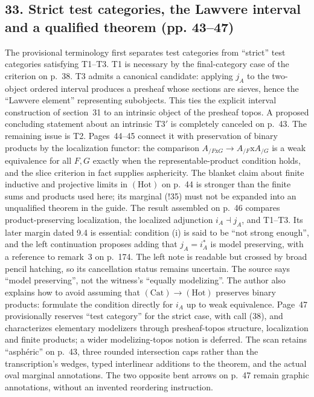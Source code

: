 \documentclass[10pt,oneside]{book}
\begin{document}
\subsection*{33. Strict test categories, the Lawvere interval and a qualified theorem (pp. 43--47)}
The provisional terminology first separates test categories from ``strict'' test categories satisfying T1--T3. T1 is necessary by the final-category case of the criterion on p.~38. T3 admits a canonical candidate: applying $j_A$ to the two-object ordered interval produces a presheaf whose sections are sieves, hence the ``Lawvere element'' representing subobjects. This ties the explicit interval construction of section~31 to an intrinsic object of the presheaf topos. A proposed concluding statement about an intrinsic T3$'$ is completely canceled on p.~43. The remaining issue is T2. Pages~44--45 connect it with preservation of binary products by the localization functor: the comparison $A_{/F\mathrm{x}G}\to A_{/F}\mathrm{x}A_{/G}$ is a weak equivalence for all $F,G$ exactly when the representable-product condition holds, and the slice criterion in fact supplies asphericity. The blanket claim about finite inductive and projective limits in $(\mathrm{Hot})$ on p.~44 is stronger than the finite sums and products used here; its marginal (!35) must not be expanded into an unqualified theorem in the guide. The result assembled on p.~46 compares product-preserving localization, the localized adjunction $i_A\dashv j_A$, and T1--T3. Its later margin dated 9.4 is essential: condition (i) is said to be ``not strong enough'', and the left continuation proposes adding that $j_A=i_A^*$ is model preserving, with a reference to remark~3 on p.~174. The left note is readable but crossed by broad pencil hatching, so its cancellation status remains uncertain. The source says ``model preserving'', not the witness's ``equally modelizing''. The author also explains how to avoid assuming that $(\mathrm{Cat})\to(\mathrm{Hot})$ preserves binary products: formulate the condition directly for $i_A$ up to weak equivalence. Page~47 provisionally reserves ``test category'' for the strict case, with call (38), and characterizes elementary modelizers through presheaf-topos structure, localization and finite products; a wider modelizing-topos notion is deferred. The scan retains ``asphéric'' on p.~43, three rounded intersection caps rather than the transcription's wedges, typed interlinear additions to the theorem, and the actual oval marginal annotations. The two opposite bent arrows on p.~47 remain graphic annotations, without an invented reordering instruction.
\end{document}
